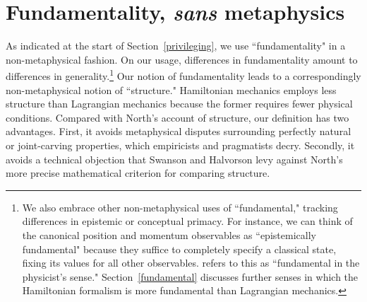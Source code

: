 \documentclass[letterpaper]{article}
\begin{document}
\section{Fundamentality, \textit{sans} metaphysics}
\label{fundamentality}




As indicated at the start of Section~\ref{privileging}, we use ``fundamentality" in a non-metaphysical fashion. On our usage, differences in fundamentality amount to differences in generality.\footnote{We also embrace other non-metaphysical uses of ``fundamental," tracking differences in epistemic or conceptual primacy. For instance, we can think of the canonical position and momentum observables as ``epistemically fundamental" because they suffice to completely specify a classical state, fixing its values for all other observables. \textcites[31, 200]{Ruetsche} refers to this as ``fundamental in the physicist's sense." Section~\ref{fundamental} discusses further senses in which the Hamiltonian formalism is more fundamental than Lagrangian mechanics.} Our notion of fundamentality leads to a correspondingly non-metaphysical notion of ``structure." Hamiltonian mechanics employs less structure than Lagrangian mechanics because the former requires fewer physical conditions. Compared with North's \parencites*[]{North} account of structure, our definition has two advantages. First, it avoids metaphysical disputes surrounding perfectly natural or joint-carving properties, which empiricists and pragmatists decry. Secondly, it avoids a technical objection that Swanson and Halvorson \parencites*[]{Swanson} levy against North's more precise mathematical criterion for comparing structure. 
\end{document}
